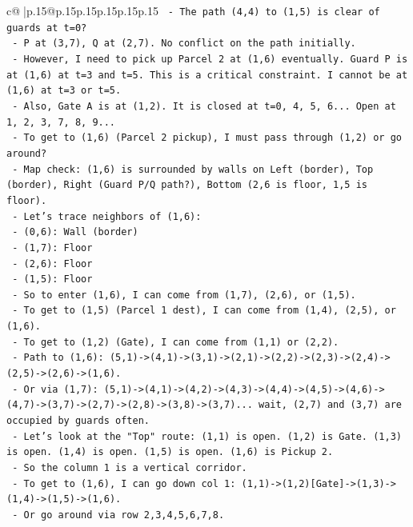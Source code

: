 \documentclass{article}
\begin{document}
{\begin{supertabular}{c@{$\;$}|p{.15\linewidth}@{}p{.15\linewidth}p{.15\linewidth}p{.15\linewidth}p{.15\linewidth}p{.15\linewidth}}
{{{\texttt{    {-} The path (4,4) to (1,5) is clear of guards at t=0?} \\
\texttt{      {-} P at (3,7), Q at (2,7). No conflict on the path initially.} \\
\texttt{    {-} However, I need to pick up Parcel 2 at (1,6) eventually. Guard P is at (1,6) at t=3 and t=5. This is a critical constraint. I cannot be at (1,6) at t=3 or t=5.} \\
\texttt{    {-} Also, Gate A is at (1,2). It is closed at t=0, 4, 5, 6... Open at 1, 2, 3, 7, 8, 9...} \\
\texttt{    {-} To get to (1,6) (Parcel 2 pickup), I must pass through (1,2) or go around?} \\
\texttt{      {-} Map check: (1,6) is surrounded by walls on Left (border), Top (border), Right (Guard P/Q path?), Bottom (2,6 is floor, 1,5 is floor).} \\
\texttt{      {-} Let's trace neighbors of (1,6):} \\
\texttt{        {-} (0,6): Wall (border)} \\
\texttt{        {-} (1,7): Floor} \\
\texttt{        {-} (2,6): Floor} \\
\texttt{        {-} (1,5): Floor} \\
\texttt{      {-} So to enter (1,6), I can come from (1,7), (2,6), or (1,5).} \\
\texttt{      {-} To get to (1,5) (Parcel 1 dest), I can come from (1,4), (2,5), or (1,6).} \\
\texttt{      {-} To get to (1,2) (Gate), I can come from (1,1) or (2,2).} \\
\texttt{      {-} Path to (1,6): (5,1){-}>(4,1){-}>(3,1){-}>(2,1){-}>(2,2){-}>(2,3){-}>(2,4){-}>(2,5){-}>(2,6){-}>(1,6).} \\
\texttt{      {-} Or via (1,7): (5,1){-}>(4,1){-}>(4,2){-}>(4,3){-}>(4,4){-}>(4,5){-}>(4,6){-}>(4,7){-}>(3,7){-}>(2,7){-}>(2,8){-}>(3,8){-}>(3,7)... wait, (2,7) and (3,7) are occupied by guards often.} \\
\texttt{      {-} Let's look at the "Top" route: (1,1) is open. (1,2) is Gate. (1,3) is open. (1,4) is open. (1,5) is open. (1,6) is Pickup 2.} \\
\texttt{      {-} So the column 1 is a vertical corridor.} \\
\texttt{      {-} To get to (1,6), I can go down col 1: (1,1){-}>(1,2){[}Gate{]}{-}>(1,3){-}>(1,4){-}>(1,5){-}>(1,6).} \\
\texttt{      {-} Or go around via row 2,3,4,5,6,7,8.} \\
}}}
\end{supertabular}}
\end{document}
